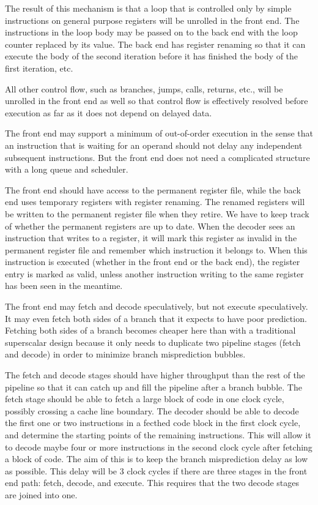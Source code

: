 \documentclass[forwardcom.tex]{subfiles}
\begin{document}
The result of this mechanism is that a loop that is controlled only by simple instructions on general purpose registers
will be unrolled in the front end. The instructions in the loop body may be passed on to the back end with the loop counter replaced by its value. The back end has register renaming so that it can execute the body of the second iteration before it has finished the body of the first iteration, etc.
\vspace{2mm}

All other control flow, such as branches, jumps, calls, returns, etc., will be unrolled in the front end as well so that control flow is effectively resolved before execution as far as it does not depend on delayed data.
\vspace{2mm}

The front end may support a minimum of out-of-order execution in the sense that an instruction that is waiting for an operand should not delay any independent subsequent instructions. But the front end does not need a complicated structure with a long queue and scheduler.
\vspace{2mm}


The front end should have access to the permanent register file, while the back end uses temporary registers with register renaming. The renamed registers will be written to the permanent register file when they retire. We have to keep track of whether the permanent registers are up to date. When the decoder sees an instruction that writes to a register, it will mark this register as invalid in the permanent register file and remember which instruction it belongs to. When this instruction is executed (whether in the front end or the back end), the register entry is marked as valid, unless another instruction writing to the same register has been seen in the meantime.
\vspace{2mm}

The front end may fetch and decode speculatively, but not execute speculatively. It may even fetch both sides of a branch that it expects to have poor prediction. Fetching both sides of a branch becomes cheaper here than with a traditional superscalar design because it only needs to duplicate two pipeline stages (fetch and decode) in order to minimize branch misprediction bubbles.
\vspace{2mm}

The fetch and decode stages should have higher throughput than the rest of the pipeline so that it can catch up and fill the pipeline after a branch bubble. The fetch stage should be able to fetch a large block of code in one clock cycle, possibly crossing a cache line boundary. The decoder should be able to decode the first one or two instructions in a fecthed code block in the first clock cycle, and determine the starting points of the remaining instructions. This will allow it to decode maybe four or more instructions in the second clock cycle after fetching a block of code. The aim of this is to keep the branch misprediction delay as low as possible. This delay will be 3 clock cycles if there are three stages in the front end path: fetch, decode, and execute. This requires that the two decode stages are joined into one.
\vspace{2mm}
\end{document}
